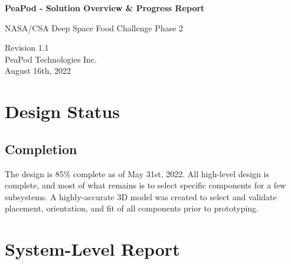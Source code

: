 \documentclass{../tex/report}
\begin{document}
\begin{titlepage}
    \begin{center}
        \vspace*{1.2cm}

        \textbf{\large{PeaPod - Solution Overview \& Progress Report}}

        \vspace{0.5cm}

        NASA/CSA Deep Space Food Challenge Phase 2

        \vfill
        
        \vspace{.75cm}

        Revision 1.1\\
        PeaPod Technologies Inc.\\
        August 16th, 2022

    \end{center}
\end{titlepage}

\thispagestyle{plain}

\tableofcontents
\clearpage

\section{Design Status}

\subsection{Completion}

The design is 85\% complete as of May 31st, 2022. All high-level design is complete, and most of what remains is to select specific components for a few subsystems. A highly-accurate 3D model was created to select and validate placement, orientation, and fit of all components prior to prototyping.



\clearpage

\section{System-Level Report}



\clearpage
\end{document}
